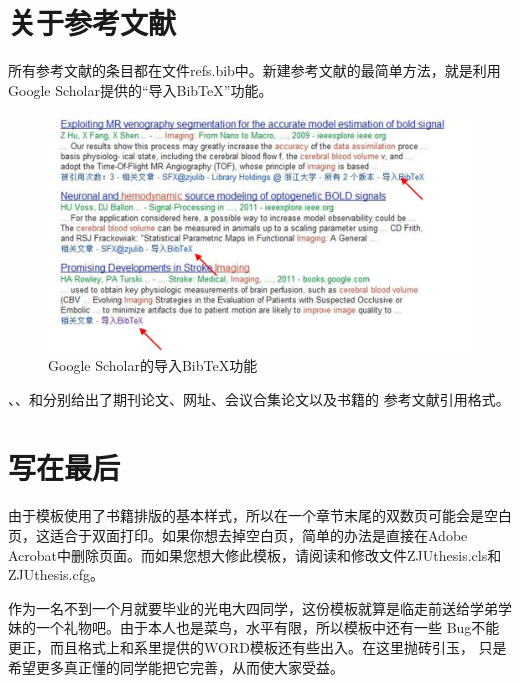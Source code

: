 \chapter{关于参考文献}
所有参考文献的条目都在文件refs.bib中。新建参考文献的最简单方法，就是利用Google Scholar提供的“导入BibTeX”功能。

\begin{figure}[htbp]
\begin{center}
	\includegraphics[width=0.8\linewidth]{google.jpg}
\end{center}
\caption{Google Scholar的导入BibTeX功能}
\label{fig:google}
\end{figure}

\cite{knaus1981apache}、\cite{website:challenge}、\cite{hug2009icu}和\cite{jobson2005applied}分别给出了期刊论文、网址、会议合集论文以及书籍的
参考文献引用格式。

\chapter{写在最后}
由于模板使用了书籍排版的基本样式，所以在一个章节末尾的双数页可能会是空白页，这适合于双面打印。如果你想去掉空白页，简单的办法是直接在Adobe Acrobat中删除页面。而如果您想大修此模板，请阅读和修改文件ZJUthesis.cls和ZJUthesis.cfg。

作为一名不到一个月就要毕业的光电大四同学，这份模板就算是临走前送给学弟学妹的一个礼物吧。由于本人也是菜鸟，水平有限，所以模板中还有一些
Bug不能更正，而且格式上和系里提供的WORD模板还有些出入。在这里抛砖引玉，
只是希望更多真正懂的同学能把它完善，从而使大家受益{\LARGE{\Smiley}}。 